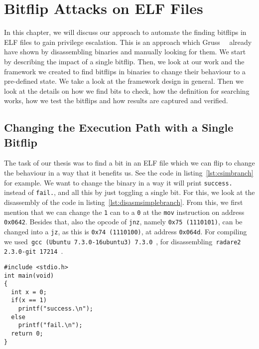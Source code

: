 \chapter{Bitflip Attacks on ELF Files}\label{sec:bitflip}

In this chapter, we will discuss our approach to automate the finding bitflips
in ELF files to gain privilege escalation. This is an approach which
Gruss~\etal~\cite{flipinthewall} already have shown by disassembling binaries
and manually looking for them. We start by describing the impact of a single
bitflip. Then, we look at our work and the framework we created to find bitflips
in binaries to change their behaviour to a pre-defined state. We take a look at
the framework design in general. Then we look at the details on how we find bits
to check, how the definition for searching works, how we test the bitflips and
how results are captured and verified.

\section{Changing the Execution Path with a Single Bitflip}

The task of our thesis was to find a bit in an ELF file which we can flip to
change the behaviour in a way that it benefits us. See the code in
listing~\ref{lst:csimbranch} for example. We want to change the binary in a way
it will print \texttt{success.} instead of \texttt{fail.}, and all this by just
toggling a single bit. For this, we look at the disassembly of the code in
listing~\ref{lst:disasmsimplebranch}. From this, we first mention that we can
change the \texttt{1} can to a \texttt{0} at the \texttt{mov} instruction on
address \texttt{0x0642}. Besides that, also the opcode of \texttt{jnz}, namely
\texttt{0x75 (1110101)}, can be changed into a \texttt{jz}, as this is
\texttt{0x74 (1110100)}, at address \texttt{0x064d}. For compiling we
used~\texttt{gcc (Ubuntu 7.3.0-16ubuntu3) 7.3.0}~\cite{gccubuntu}, for
disassembling~\texttt{radare2 2.3.0-git 17214}~\cite{radare2web}.

\begin{minipage}{\linewidth}
\begin{lstlisting}[style=CStyle,
                   caption={Simple branching code to show an example for a
single bitflip to change the execution path.},
                   label={lst:csimbranch}]
#include <stdio.h>
int main(void)
{
  int x = 0;
  if(x == 1)
    printf("success.\n");
  else
    printf("fail.\n");
  return 0;
}
\end{lstlisting}
\end{minipage}

